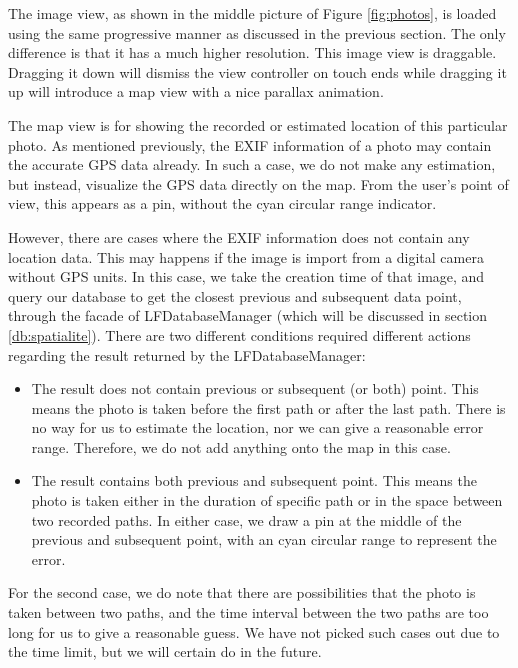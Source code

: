 \documentclass[12pt,a4paper]{article}
\renewcommand\texttt[1]{{\ttfamily\color{textttColor}#1}}
\begin{document}
            The image view, as shown in the middle picture of Figure \ref{fig:photos}, is loaded using the same progressive manner as discussed in the previous section. The only difference is that it has a much higher resolution. This image view is draggable. Dragging it down will dismiss the view controller on touch ends while dragging it up will introduce a map view with a nice parallax animation.
            
            The map view is for showing the recorded or estimated location of this particular photo. As mentioned previously, the EXIF information of a photo may contain the accurate GPS data already. In such a case, we do not make any estimation, but instead, visualize the GPS data directly on the map. From the user's point of view, this appears as a pin, without the cyan circular range indicator. 
            
            However, there are cases where the EXIF information does not contain any location data. This may happens if the image is import from a digital camera without GPS units. In this case, we take the creation time of that image, and query our database to get the closest previous and subsequent data point, through the facade of \texttt{LFDatabaseManager} (which will be discussed in section \ref{db:spatialite}). There are two different conditions required different actions regarding the result returned by the \texttt{LFDatabaseManager}:
            
            \begin{itemize}
                \item The result does not contain previous or subsequent (or both) point. This means the photo is taken before the first path or after the last path. There is no way for us to estimate the location, nor we can give a reasonable error range. Therefore, we do not add anything onto the map in this case.
                
                \item The result contains both previous and subsequent point. This means the photo is taken either in the duration of specific path or in the space between two recorded paths. In either case, we draw a pin at the middle of the previous and subsequent point, with an cyan circular range to represent the error.
            \end{itemize}
            
            For the second case, we do note that there are possibilities that the photo is taken  between two paths, and the time interval between the two paths are too long for us to give a reasonable guess. We have not picked such cases out due to the time limit, but we will certain do in the future.
            
\end{document}
